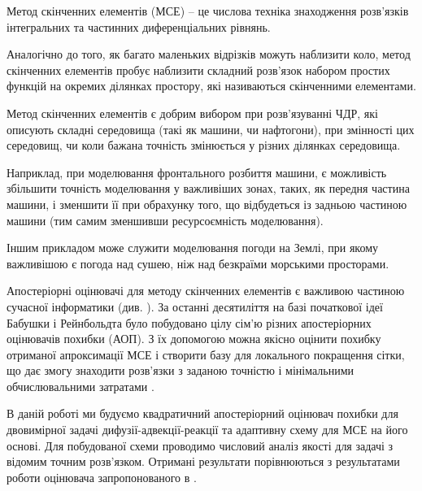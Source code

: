 

Метод скінченних елементів (МСЕ) -- це числова техніка знаходження розв'язків інтегральних та частинних диференціальних рівнянь.

Аналогічно до того, як багато маленьких відрізків можуть наблизити коло, метод скінченних елементів пробує наблизити складний розв'язок набором простих функцій на окремих ділянках простору, які називаються скінченними елементами.

Метод скінченних елементів є добрим вибором при розв'язуванні ЧДР, які описують складні середовища (такі як машини, чи нафтогони), при змінності цих середовищ, чи коли бажана точність змінюється у різних ділянках середовища.

Наприклад, при моделювання фронтального розбиття машини, є можливість збільшити точність моделювання у важливіших зонах, таких, як передня частина машини, і зменшити її при обрахунку того, що відбудеться із задньою частиною машини (тим самим зменшивши ресурсоємність моделювання).

Іншим прикладом може служити моделювання погоди на Землі, при якому важливішою є погода над сушею, ніж над безкраїми морськими просторами.

Апостеріорні оцінювачі для методу скінченних елементів є важливою частиною сучасної інформатики (див. \cite{verfurth1996review, verfurth1994posteriori,eriksson1995introduction,ainsworth2011posteriori}). За останні десятиліття на базі початкової ідеї Бабушки і Рейнбольдта \cite{babuvska1978posteriori} було побудовано цілу сім'ю різних апостеріорних оцінювачів похибки (АОП). З їх допомогою можна якісно оцінити похибку отриманої апроксимації МСЕ і створити базу для локального покращення сітки, що дає змогу знаходити розв'язки з заданою точністю і мінімальними обчислювальними затратами \cite{babuska2011finite}.

В даній роботі ми будуємо квадратичний апостеріорний оцінювач похибки для двовимірної задачі дифузії-адвекції-реакції та адаптивну схему для МСЕ на його основі. Для побудованої схеми проводимо числовий аналіз якості для задачі з відомим точним розв'язком.
Отримані результати порівнюються з результатами роботи оцінювача запропонованого в \cite{OstShynAee11}.
